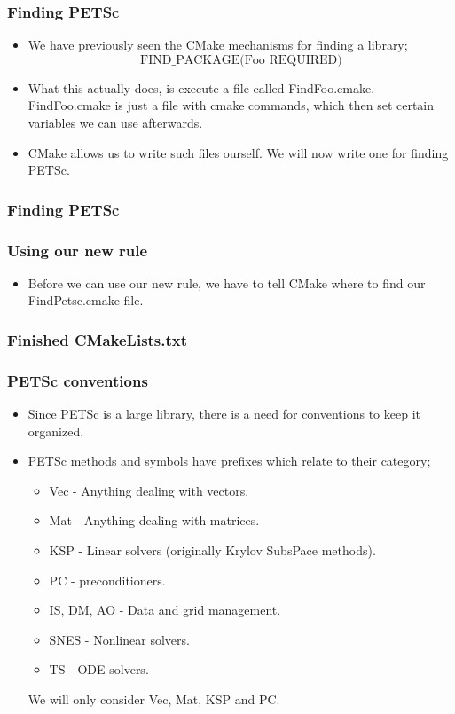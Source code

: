 \documentclass{beamer}
\begin{document}
\begin{frame}\frametitle{Finding PETSc}
  \begin{itemize}
    \item We have previously seen the CMake mechanisms for finding a library;
        \[
          \text{FIND\_PACKAGE(Foo REQUIRED)}
        \]
     \item What this actually does, is execute a file called FindFoo.cmake.
           FindFoo.cmake is just a file with cmake commands, which then set
           certain variables we can use afterwards.
     \item CMake allows us to write such files ourself. We will now write
           one for finding PETSc.
  \end{itemize}
\end{frame}

\begin{frame}\frametitle{Finding PETSc}
  
\end{frame}

\begin{frame}\frametitle{Using our new rule}
  \begin{itemize}
    \item Before we can use our new rule, we have to tell CMake where to find
        our FindPetsc.cmake file.
        
  \end{itemize}
\end{frame}

\begin{frame}\frametitle{Finished CMakeLists.txt}
  
\end{frame}

\begin{frame}\frametitle{PETSc conventions}
  \begin{itemize}
    \item Since PETSc is a large library, there is a need for conventions to
        keep it organized.
    \item PETSc methods and symbols have prefixes which relate to their category;
      \begin{itemize}
        \item Vec - Anything dealing with vectors.
        \item Mat - Anything dealing with matrices.
        \item KSP - Linear solvers (originally Krylov SubsPace methods).
        \item PC - preconditioners.
        \item IS, DM, AO - Data and grid management.
        \item SNES - Nonlinear solvers.
        \item TS - ODE solvers.
      \end{itemize}
      We will only consider Vec, Mat, KSP and PC.
  \end{itemize}
\end{frame}
\end{document}

